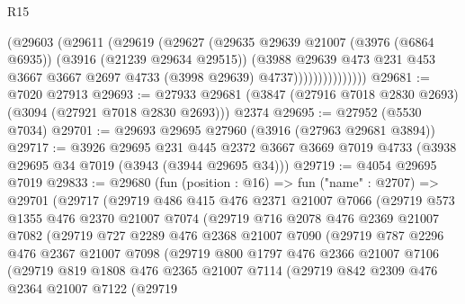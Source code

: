 \begin{lexlean}{R15}
\begin{coremodule}
                      (@29603
                        (@29611
                          (@29619
                            (@29627
                              (@29635
                                @29639
                                @21007
                                (@3976 (@6864 @6935))
                                (@3916 (@21239 @29634 @29515))
                                (@3988
                                  @29639
                                  @473
                                  @231
                                  @453
                                  @3667
                                  @3667
                                  @2697
                                  @4733
                                  (@3998 @29639)
                                  @4737)))))))))))))))
@29681 := @7020 @27913
@29693 := @27933 @29681 (@3847 (@27916 @7018 @2830 @2693) (@3094 (@27921 @7018 @2830 @2693))) @2374
@29695 := @27952 (@5530 @7034)
@29701 := @29693 @29695 @27960 (@3916 (@27963 @29681 @3894))
@29717 := @3926
    @29695
    @231
    @445
    @2372
    @3667
    @3669
    @7019
    @4733
    (@3938 @29695 @34 @7019 (@3943 (@3944 @29695 @34)))
@29719 := @4054 @29695 @7019
@29833 := @29680
    (fun (position : @16) =>
    fun ("name" : @2707) =>
    @29701
      (@29717
        (@29719
          @486
          @415
          @476
          @2371
          @21007
          @7066
          (@29719
            @573
            @1355
            @476
            @2370
            @21007
            @7074
            (@29719
              @716
              @2078
              @476
              @2369
              @21007
              @7082
              (@29719
                @727
                @2289
                @476
                @2368
                @21007
                @7090
                (@29719
                  @787
                  @2296
                  @476
                  @2367
                  @21007
                  @7098
                  (@29719
                    @800
                    @1797
                    @476
                    @2366
                    @21007
                    @7106
                    (@29719
                      @819
                      @1808
                      @476
                      @2365
                      @21007
                      @7114
                      (@29719
                        @842
                        @2309
                        @476
                        @2364
                        @21007
                        @7122
                        (@29719

\end{coremodule}
\end{lexlean}
